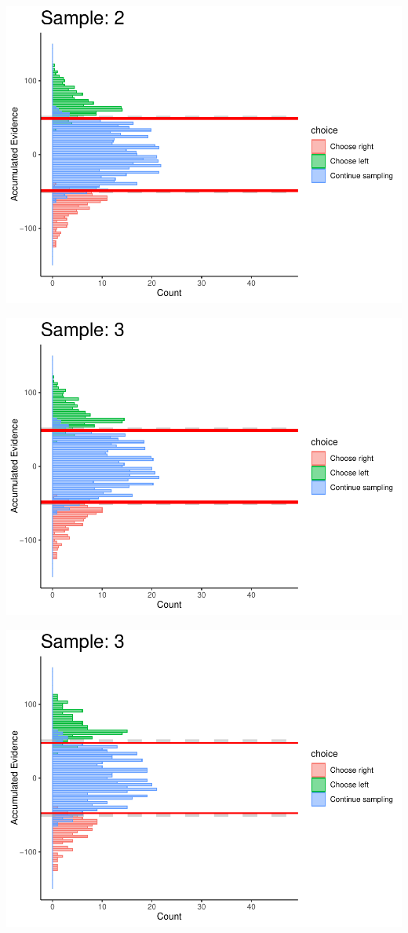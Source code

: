 \documentclass[
]{book}
\begin{document}
\begin{center}\includegraphics[width=0.8\linewidth]{LateNightBayes_files/figure-latex/fixed_dcb-19} \end{center}

\begin{center}\includegraphics[width=0.8\linewidth]{LateNightBayes_files/figure-latex/fixed_dcb-20} \end{center}

\begin{center}\includegraphics[width=0.8\linewidth]{LateNightBayes_files/figure-latex/fixed_dcb-21} \end{center}
\end{document}
